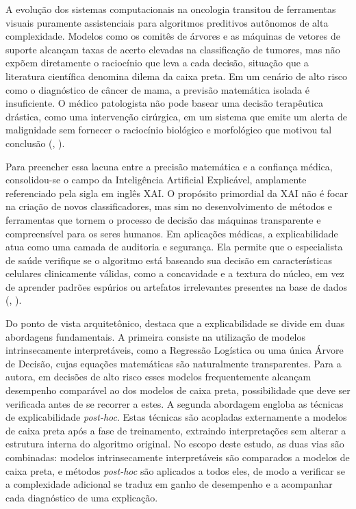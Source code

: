 \documentclass[
    12pt
    ,oneside
    ,a4paper
    ,chapter=TITLE
    ,section=TITLE
    ,sumario=abnt-6027-2012
    ,english,brazil]{abntex2} %
\begin{document}
A evolução dos sistemas computacionais na oncologia transitou de ferramentas visuais puramente assistenciais para algoritmos preditivos autônomos de alta complexidade. Modelos como os comitês de árvores e as máquinas de vetores de suporte alcançam taxas de acerto elevadas na classificação de tumores, mas não expõem diretamente o raciocínio que leva a cada decisão, situação que a literatura científica denomina dilema da caixa preta. Em um cenário de alto risco como o diagnóstico de câncer de mama, a previsão matemática isolada é insuficiente. O médico patologista não pode basear uma decisão terapêutica drástica, como uma intervenção cirúrgica, em um sistema que emite um alerta de malignidade sem fornecer o raciocínio biológico e morfológico que motivou tal conclusão (, \citeyear{Holzinger2019}).

Para preencher essa lacuna entre a precisão matemática e a confiança médica, consolidou-se o campo da Inteligência Artificial Explicável, amplamente referenciado pela sigla em inglês XAI. O propósito primordial da XAI não é focar na criação de novos classificadores, mas sim no desenvolvimento de métodos e ferramentas que tornem o processo de decisão das máquinas transparente e compreensível para os seres humanos. Em aplicações médicas, a explicabilidade atua como uma camada de auditoria e segurança. Ela permite que o especialista de saúde verifique se o algoritmo está baseando sua decisão em características celulares clinicamente válidas, como a concavidade e a textura do núcleo, em vez de aprender padrões espúrios ou artefatos irrelevantes presentes na base de dados (, \citeyear{Adadi2018}).

Do ponto de vista arquitetônico,  destaca que a explicabilidade se divide em duas abordagens fundamentais. A primeira consiste na utilização de modelos intrinsecamente interpretáveis, como a Regressão Logística ou uma única Árvore de Decisão, cujas equações matemáticas são naturalmente transparentes. Para a autora, em decisões de alto risco esses modelos frequentemente alcançam desempenho comparável ao dos modelos de caixa preta, possibilidade que deve ser verificada antes de se recorrer a estes. A segunda abordagem engloba as técnicas de explicabilidade \textit{post-hoc}. Estas técnicas são acopladas externamente a modelos de caixa preta após a fase de treinamento, extraindo interpretações sem alterar a estrutura interna do algoritmo original. No escopo deste estudo, as duas vias são combinadas: modelos intrinsecamente interpretáveis são comparados a modelos de caixa preta, e métodos \textit{post-hoc} são aplicados a todos eles, de modo a verificar se a complexidade adicional se traduz em ganho de desempenho e a acompanhar cada diagnóstico de uma explicação.
\end{document}
